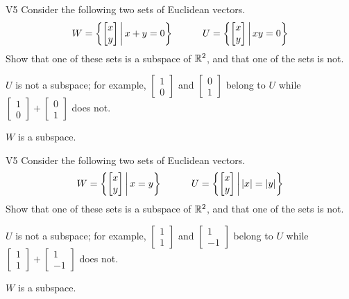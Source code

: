 \begin{problem}{V5}
Consider the following two sets of Euclidean vectors.
\[
  W = \left\{\begin{bmatrix} x \\ y \end{bmatrix}\,\middle|\,x+y=0\right\}
\hspace{3em}
  U = \left\{\begin{bmatrix} x \\ y \end{bmatrix}\,\middle|\,xy=0\right\}
\]
Show that one of these sets is a subspace of \(\mathbb{R}^2\), and
that one of the sets is not.
\end{problem}
\begin{solution}
\(U\) is not a subspace; for example, \(\begin{bmatrix} 1 \\ 0 \end{bmatrix}\)
and \(\begin{bmatrix} 0 \\ 1 \end{bmatrix}\) belong to \(U\) while
\(\begin{bmatrix} 1 \\ 0 \end{bmatrix}+\begin{bmatrix} 0 \\ 1 \end{bmatrix}\)
does not.

\(W\) is a subspace.
\end{solution}

\begin{problem}{V5}
Consider the following two sets of Euclidean vectors.
\[
  W = \left\{\begin{bmatrix} x \\ y \end{bmatrix}\,\middle|\,x=y\right\}
\hspace{3em}
  U = \left\{\begin{bmatrix} x \\ y \end{bmatrix}\,\middle|\,|x|=|y|\right\}
\]
Show that one of these sets is a subspace of \(\mathbb{R}^2\), and
that one of the sets is not.
\end{problem}
\begin{solution}
\(U\) is not a subspace; for example, \(\begin{bmatrix} 1 \\ 1 \end{bmatrix}\)
and \(\begin{bmatrix} 1 \\ -1 \end{bmatrix}\) belong to \(U\) while
\(\begin{bmatrix} 1 \\ 1 \end{bmatrix}+\begin{bmatrix} 1 \\ -1 \end{bmatrix}\)
does not.

\(W\) is a subspace.
\end{solution}

